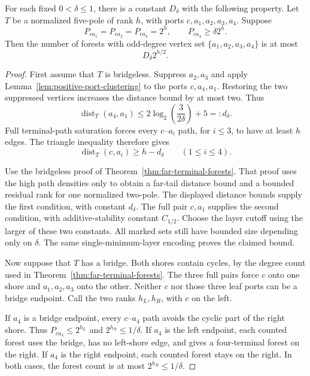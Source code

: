 \begin{theorem}
\label{thm:partial-five-star-return}
For each fixed $0<\delta\le1$, there is a constant $D_\delta$ with the following property.
Let $T$ be a normalized five-pole of rank $h$, with ports $c,a_1,a_2,a_3,a_4$.
Suppose
\[
 P_{ca_1}=P_{ca_2}=P_{ca_3}=2^h,
 \qquad P_{ca_4}\ge\delta2^h.
\]
Then the number of forests with odd-degree vertex set $\{a_1,a_2,a_3,a_4\}$ is at most
\[
 D_\delta2^{h/2}.
\]
\end{theorem}

\begin{proof}
First assume that $T$ is bridgeless.
Suppress $a_2,a_3$ and apply Lemma~\ref{lem:positive-port-clustering} to the ports $c,a_4,a_1$.
Restoring the two suppressed vertices increases the distance bound by at most two.
Thus
\[
 \operatorname{dist}_T(a_4,a_1)
 \le2\log_2\!\left(\frac3{2\delta}\right)+5=:d_\delta.
\]
Full terminal-path saturation forces every $c$--$a_i$ path, for $i\le3$, to have at least $h$ edges.
The triangle inequality therefore gives
\[
 \operatorname{dist}_T(c,a_i)\ge h-d_\delta
 \qquad(1\le i\le4).
\]

Use the bridgeless proof of Theorem~\ref{thm:far-terminal-forests}.
That proof uses the high path densities only to obtain a far-tail distance bound and a bounded residual rank for one normalized two-pole.
The displayed distance bounds supply the first condition, with constant $d_\delta$.
The full pair $c,a_1$ supplies the second condition, with additive-stability constant $C_{1/2}$.
Choose the layer cutoff using the larger of these two constants.
All marked sets still have bounded size depending only on $\delta$.
The same single-minimum-layer encoding proves the claimed bound.

Now suppose that $T$ has a bridge.
Both shores contain cycles, by the degree count used in Theorem~\ref{thm:far-terminal-forests}.
The three full pairs force $c$ onto one shore and $a_1,a_2,a_3$ onto the other.
Neither $c$ nor those three leaf ports can be a bridge endpoint.
Call the two ranks $h_L,h_R$, with $c$ on the left.

If $a_4$ is a bridge endpoint, every $c$--$a_4$ path avoids the cyclic part of the right shore.
Thus $P_{ca_4}\le2^{h_L}$ and $2^{h_R}\le1/\delta$.
If $a_4$ is the left endpoint, each counted forest uses the bridge, has no left-shore edge, and gives a four-terminal forest on the right.
If $a_4$ is the right endpoint, each counted forest stays on the right.
In both cases, the forest count is at most $2^{h_R}\le1/\delta$.


\end{proof}
